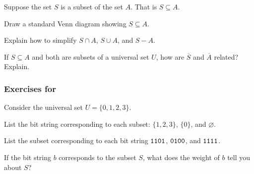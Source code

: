 \begin{exer}[\exerE] %
\label{exer_set_ops_if_subset}
    Suppose the set $S$ is a subset of the set $A$.  That is $S \subseteq A$.
        \begin{exerpart}
            \item Draw a standard Venn diagram showing $S \subseteq A$.  
            \item Explain how to simplify $S \cap A$, $S \cup A$, and $S-A$.
            \item If $S \subseteq A$ and both are subsets of a universal set $U$, how are $\overline{S}$ and $\overline{A}$ related?  Explain.
        \end{exerpart}
\end{exer}


\subsubsection*{Exercises for 
\subbsrepsubset}

\begin{exer}[\exerP] %
\label{exer_bs_rep_subsets}
    Consider the universal set $U = \{0,1,2,3\}$.
    \begin{exerpart}
        \item List the bit string corresponding to each subset: $\{1,2,3\}$, $\{0\}$, and $\varnothing$.
        \item List the subset corresponding to each bit string $\texttt{1101}$, $\texttt{0100}$, and $\texttt{1111}$.
        \item If the bit string $b$ corresponds to the subset $S$, what does the weight of $b$ tell you about $S$?
    \end{exerpart}
\end{exer}


